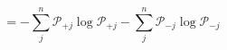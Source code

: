 \begin{equation}
\ = -\sum_j^n\mathcal P_{+j}\log\mathcal P_{+j} -\sum_j^n\mathcal P_{-j}\log\mathcal P_{-j} 
\end{equation}